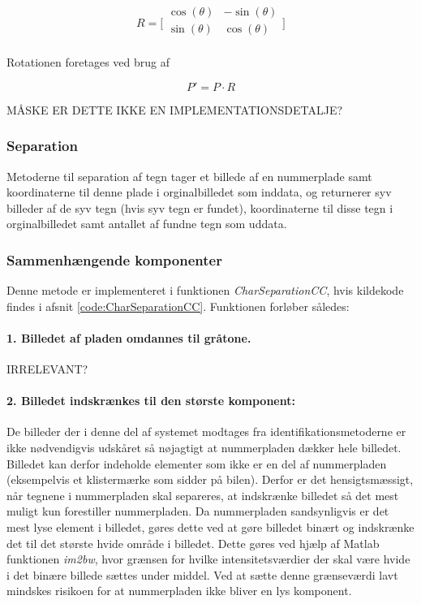 \begin{displaymath} 
R = 
\biggl[ \begin{array}{cc} 
\cos(\theta) & - \sin(\theta) \\
\sin(\theta) & \cos(\theta) \\
\end{array} \biggr] 
\end{displaymath}

Rotationen foretages ved brug af

\begin{displaymath}
P' = P \cdot R
\end{displaymath}

MÅSKE ER DETTE IKKE EN IMPLEMENTATIONSDETALJE?

\subsubsection{Separation}

Metoderne til separation af tegn tager et billede af en nummerplade samt koordinaterne til denne plade i orginalbilledet som inddata, og returnerer syv billeder af de syv tegn (hvis syv tegn er fundet), koordinaterne til disse tegn i orginalbilledet samt antallet af fundne tegn som uddata.

\subsubsection*{Sammenhængende komponenter}

Denne metode er implementeret i funktionen \textit{CharSeparationCC}, hvis kildekode findes i afsnit \vref{code:CharSeparationCC}. Funktionen forløber således:

\paragraph{1. Billedet af pladen omdannes til gråtone.} IRRELEVANT?

\paragraph{2. Billedet indskrænkes til den største komponent:}
De billeder der i denne del af systemet modtages fra identifikationsmetoderne er ikke nødvendigvis udskåret så nøjagtigt at nummerpladen dækker hele billedet. Billedet kan derfor indeholde elementer som ikke er en del af nummerpladen (eksempelvis et klistermærke som sidder på bilen). Derfor er det hensigtsmæssigt, når tegnene i nummerpladen skal separeres, at indskrænke billedet så det mest muligt kun forestiller nummerpladen. Da nummerpladen sandsynligvis er det mest lyse element i billedet, gøres dette ved at gøre billedet binært og indskrænke det til det største hvide område i billedet. Dette gøres ved hjælp af Matlab funktionen \textit{im2bw}, hvor grænsen for hvilke intensitetsværdier der skal være hvide i det binære billede sættes under middel. Ved at sætte denne grænseværdi lavt mindskes risikoen for at nummerpladen ikke bliver en lys komponent.

